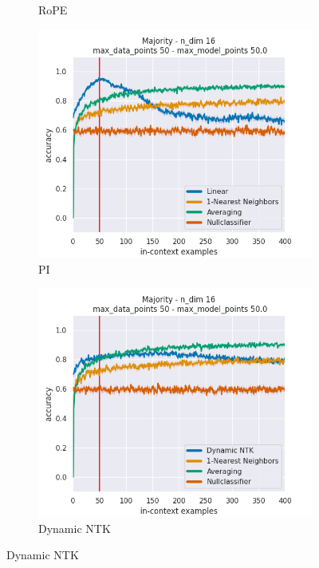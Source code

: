 \documentclass[letterpaper]{article} %
\begin{document}
\begin{figure}[tp]
\begin{subfigure}[t]{0.32\linewidth}
        \caption{RoPE}
    \end{subfigure}
    \begin{subfigure}[t]{0.32\linewidth}
        \includegraphics[width=\linewidth]{AnonymousSubmission/LaTeX/imgs/appendix/majority/linear.png}
        \caption{PI}
    \end{subfigure}
    \begin{subfigure}[t]{0.32\linewidth}
        \includegraphics[width=\linewidth]{AnonymousSubmission/LaTeX/imgs/appendix/majority/ntk.png}
        \caption{Dynamic NTK}

\end{subfigure}
\end{figure}
\end{document}
